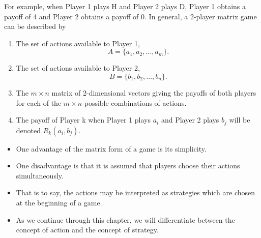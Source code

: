 \documentclass[]{report}
\begin{document}
\noindent For example, when Player 1 plays H and Player 2 plays D, Player 1
obtains a payoff of 4 and Player 2 obtains a payoff of 0.
\smallskip
\noindent In general, a 2-player matrix game can be described by
\begin{enumerate}
	\item The set of actions available to Player 1,
	\[A = \{a_1, a_2, \ldots , a_m\}.\]
\item The set of actions available to Player 2,
	\[B = \{b_1, b_2, \ldots , b_n\}.\]
\item The $m \times n$ matrix of 2-dimensional vectors giving the
	payoffs of both players for each of the $m \times n$ possible
	combinations of actions. 
\item The payoff of Player k when
	Player 1 plays $a_i$ and Player 2 plays $b_j$ will be
	denoted $R_k (a_i, b_j)$.
	
\end{enumerate}

\begin{itemize}
	\item One advantage of the matrix form of a game is its simplicity.
	\item One disadvantage is that it is assumed that players choose their
	actions simultaneously.
	\item That is to say, the actions may be
	interpreted as strategies which are chosen at the beginning of a
	game.
	\item As we continue through this chapter, we will differentiate between
	the concept of action and the concept of strategy.
	
\end{itemize}

\end{document}
